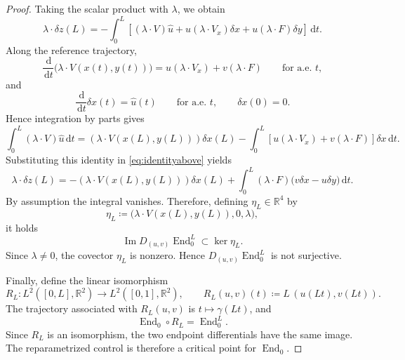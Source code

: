 \documentclass[10pt,a4paper]{amsart}
\newcommand{\End}{\operatorname{End}}
\newcommand{\R}{\mathbb R}
\newcommand{\dd}{\,\mathrm d}
\begin{document}
\begin{proof}
Taking the scalar product with $\lambda$, we obtain
\begin{equation}\label{eq:identityabove}
 \lambda\cdot\delta z(L)
 =
 -\int_0^L
 \left[
 (\lambda\cdot V)\widehat u
 +u(\lambda\cdot V_x)\delta x
 +u(\lambda\cdot F)\delta y
 \right]\dd t.
\end{equation}
Along the reference trajectory,
\begin{equation}
 \frac{\dd}{\dd t}\bigl(\lambda\cdot V(x(t),y(t))\bigr)
 =
 u(\lambda\cdot V_x)+v(\lambda\cdot F)
 \qquad\text{for a.e. }t,
\end{equation}
and
\begin{equation}
 \frac{\dd}{\dd t}\delta x(t)=\widehat u(t)
 \qquad\text{for a.e. }t,
 \qquad
 \delta x(0)=0.
\end{equation}
Hence integration by parts gives
\begin{equation}
 \int_0^L(\lambda\cdot V)\widehat u\dd t
 =
 (\lambda\cdot V(x(L),y(L)))\delta x(L)
 -
 \int_0^L
 \left[
 u(\lambda\cdot V_x)+v(\lambda\cdot F)
 \right]\delta x\dd t.
\end{equation}
Substituting this identity in \eqref{eq:identityabove} yields
\begin{equation}
 \lambda\cdot\delta z(L)
 =
 -(\lambda\cdot V(x(L),y(L)))\delta x(L)
 +
 \int_0^L
 (\lambda\cdot F)
 \bigl(v\delta x-u\delta y\bigr)\dd t.
\end{equation}
By assumption the integral vanishes. Therefore, defining $\eta_L \in \R^4$ by
\begin{equation}
 \eta_L
 \coloneq 
 \bigl(
 \lambda\cdot V(x(L),y(L)), 0, \lambda
 \bigr),
\end{equation}
it holds 
\begin{equation}
 \operatorname{Im}D_{(u,v)}\End_0^L\subset\ker\eta_L.
\end{equation}
Since $\lambda\neq0$, the covector $\eta_L$ is nonzero.  Hence $D_{(u,v)}\End_0^L$ is not surjective.

Finally, define the linear isomorphism
\begin{equation}
 R_L:L^2([0,L],\R^2)\longrightarrow L^2([0,1],\R^2),
 \qquad
 R_L(u,v)(t)\coloneq L\,(u(Lt),v(Lt)).
\end{equation}
The trajectory associated with $R_L(u,v)$ is $t\mapsto\gamma(Lt)$, and
\begin{equation}
 \End_0\circ R_L=\End_0^L.
\end{equation}
Since $R_L$ is an isomorphism, the two endpoint differentials have the
same image.  The reparametrized control is therefore a critical point for
$\End_0$.
\end{proof}
\end{document}
